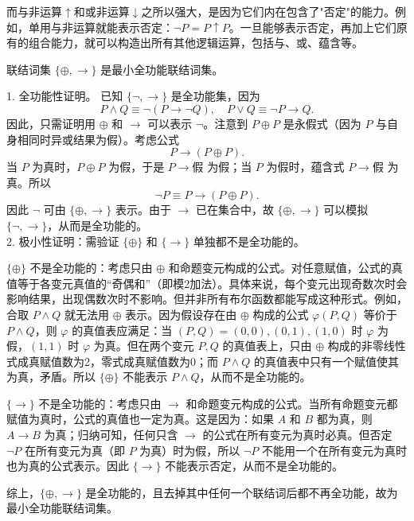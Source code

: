 \documentclass[lang=cn,11pt]{elegantbook}
\begin{document}
而与非运算$\uparrow$和或非运算$\downarrow$之所以强大，是因为它们内在包含了"否定"的能力。例如，单用与非运算就能表示否定：$\neg P = P \uparrow P$。一旦能够表示否定，再加上它们原有的组合能力，就可以构造出所有其他逻辑运算，包括与、或、蕴含等。
\begin{example}
联结词集 $\{\oplus, \rightarrow\}$ 是最小全功能联结词集。
\end{example}
\begin{solution}
1. 全功能性证明。
已知 $\{\neg, \rightarrow\}$ 是全功能集，因为
\[
P \land Q \equiv \neg(P \rightarrow \neg Q), \quad
P \lor Q \equiv \neg P \rightarrow Q.
\]
因此，只需证明用 $\oplus$ 和 $\rightarrow$ 可以表示 $\neg$。注意到 $P \oplus P$ 是永假式（因为 $P$ 与自身相同时异或结果为假）。考虑公式
\[
P \rightarrow (P \oplus P).
\]
当 $P$ 为真时，$P \oplus P$ 为假，于是 $P \rightarrow \text{假}$ 为假；当 $P$ 为假时，蕴含式 $P \rightarrow \text{假}$ 为真。所以
\[
\neg P \equiv P \rightarrow (P \oplus P).
\]
因此 $\neg$ 可由 $\{\oplus, \rightarrow\}$ 表示。由于 $\rightarrow$ 已在集合中，故 $\{\oplus, \rightarrow\}$ 可以模拟 $\{\neg, \rightarrow\}$，从而是全功能的。
\\2. 极小性证明：需验证 $\{\oplus\}$ 和 $\{\rightarrow\}$ 单独都不是全功能的。

$\{\oplus\}$ 不是全功能的：考虑只由 $\oplus$ 和命题变元构成的公式。对任意赋值，公式的真值等于各变元真值的“奇偶和”（即模2加法）。具体来说，每个变元出现奇数次时会影响结果，出现偶数次时不影响。但并非所有布尔函数都能写成这种形式。例如，合取 $P \land Q$ 就无法用 $\oplus$ 表示。因为假设存在由 $\oplus$ 构成的公式 $\varphi(P,Q)$ 等价于 $P \land Q$，则 $\varphi$ 的真值表应满足：当 $(P,Q)=(0,0),(0,1),(1,0)$ 时 $\varphi$ 为假，$(1,1)$ 时 $\varphi$ 为真。但在两个变元 $P,Q$ 的真值表上，只由 $\oplus$ 构成的非零线性式成真赋值数为2，零式成真赋值数为0；而 $P \land Q$ 的真值表中只有一个赋值使其为真，矛盾。所以 $\{\oplus\}$ 不能表示 $P \land Q$，从而不是全功能的。

 $\{\rightarrow\}$ 不是全功能的：考虑只由 $\rightarrow$ 和命题变元构成的公式。当所有命题变元都赋值为真时，公式的真值也一定为真。这是因为：如果 $A$ 和 $B$ 都为真，则 $A \rightarrow B$ 为真；归纳可知，任何只含 $\rightarrow$ 的公式在所有变元为真时必真。但否定 $\neg P$ 在所有变元为真（即 $P$ 为真）时为假，所以 $\neg P$ 不能用一个在所有变元为真时也为真的公式表示。因此 $\{\rightarrow\}$ 不能表示否定，从而不是全功能的。

综上，$\{\oplus, \rightarrow\}$ 是全功能的，且去掉其中任何一个联结词后都不再全功能，故为最小全功能联结词集。
\end{solution}
\end{document}
